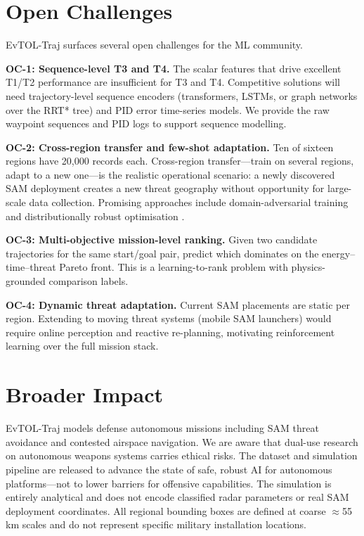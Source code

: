 \documentclass{article}
\theoremstyle{plain}
\theoremstyle{definition}
\begin{document}
\section{Open Challenges}
\label{sec:open_challenges}

EvTOL-Traj surfaces several open challenges for the ML community.

\textbf{OC-1: Sequence-level T3 and T4.}
The scalar features that drive excellent T1/T2 performance are insufficient
for T3 and T4. Competitive solutions will need trajectory-level sequence
encoders (transformers, LSTMs, or graph networks over the RRT* tree) and
PID error time-series models. We provide the raw waypoint sequences and
PID logs to support sequence modelling.

\textbf{OC-2: Cross-region transfer and few-shot adaptation.}
Ten of sixteen regions have 20{,}000 records each.
Cross-region transfer---train on several regions, adapt to a new one---is
the realistic operational scenario: a newly discovered SAM deployment
creates a new threat geography without opportunity for large-scale data
collection.
Promising approaches include domain-adversarial training
\citep{ben2010theory} and distributionally robust optimisation
\citep{sagawa2020distributionally}.

\textbf{OC-3: Multi-objective mission-level ranking.}
Given two candidate trajectories for the same start/goal pair, predict
which dominates on the energy--time--threat Pareto front.
This is a learning-to-rank problem with physics-grounded comparison labels.

\textbf{OC-4: Dynamic threat adaptation.}
Current SAM placements are static per region. Extending to moving threat
systems (mobile SAM launchers) would require online perception and reactive
re-planning, motivating reinforcement learning over the full mission stack.

\section*{Broader Impact}

EvTOL-Traj models defense autonomous missions including SAM threat
avoidance and contested airspace navigation.
We are aware that dual-use research on autonomous weapons systems carries
ethical risks.
The dataset and simulation pipeline are released to advance the state of
safe, robust AI for autonomous platforms---not to lower barriers for
offensive capabilities.
The simulation is entirely analytical and does not encode classified radar
parameters or real SAM deployment coordinates.
All regional bounding boxes are defined at coarse $\approx$55\,km scales
and do not represent specific military installation locations.
\end{document}
